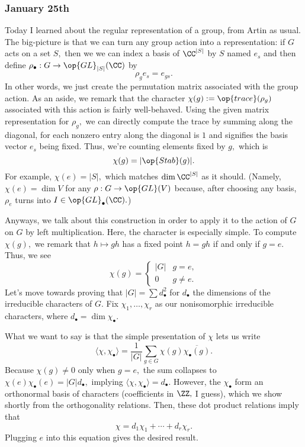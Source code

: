\subsubsection{January 25th}
Today I learned about the regular representation of a group, from Artin as usual. The big-picture is that we can turn any group action into a representation: if $G$ acts on a set $S,$ then we we can index a basis of $\CC^{|S|}$ by $S$ named $e_s$ and then define $\rho_\bullet:G\to\op{GL}_{|S|}(\CC)$ by
\[\rho_ge_s=e_{gs}.\]
In other words, we just create the permutation matrix associated with the group action. As an aside, we remark that the character $\chi(g):=\op{trace}(\rho_g)$ associated with this action is fairly well-behaved. Using the given matrix representation for $\rho_g,$ we can directly compute the trace by summing along the diagonal, for each nonzero entry along the diagonal is $1$ and signifies the basis vector $e_s$ being fixed. Thus, we're counting elements fixed by $g,$ which is
\[\chi(g)=|\op{Stab}(g)|.\]
For example, $\chi(e)=|S|,$ which matches $\dim\CC^{|S|}$ as it should. (Namely, $\chi(e)=\dim V$ for any $\rho:G\to\op{GL}(V)$ because, after choosing any basis, $\rho_e$ turns into $I\in\op{GL}_\bullet(\CC).$)

Anyways, we talk about this construction in order to apply it to the action of $G$ on $G$ by left multiplication. Here, the character is especially simple. To compute $\chi(g),$ we remark that $h\mapsto gh$ has a fixed point $h=gh$ if and only if $g=e.$ Thus, we see
\[\chi(g)=\begin{cases}
    |G| & g=e, \\
    0 & g\ne e.
\end{cases}\]
Let's move towards proving that $|G|=\sum d_\bullet^2$ for $d_\bullet$ the dimensions of the irreducible characters of $G.$ Fix $\chi_1,\ldots,\chi_r$ as our nonisomorphic irreducible characters, where $d_\bullet=\dim\chi_\bullet.$

What we want to say is that the simple presentation of $\chi$ lets us write
\[\langle\chi,\chi_\bullet\rangle=\frac1{|G|}\sum_{g\in G}\chi(g)\overline{\chi_\bullet(g)}.\]
Because $\chi(g)\ne0$ only when $g=e,$ the sum collapses to $\chi(e)\chi_\bullet(e)=|G|d_\bullet,$ implying $\langle\chi,\chi_\bullet\rangle=d_\bullet.$ However, the $\chi_\bullet$ form an orthonormal basis of characters (coefficients in $\ZZ,$ I guess), which we show shortly from the orthogonality relations. Then, these dot product relations imply that
\[\chi=d_1\chi_1+\cdots+d_r\chi_r.\]
Plugging $e$ into this equation gives the desired result.

